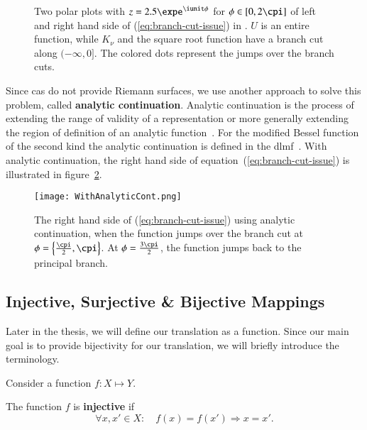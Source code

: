 \begin{figure}[!ht]
    \centering
    \hspace{1cm}
    \caption{Two polar plots with $z=2.5\expe^{\iunit\phi}$ for $\phi \in [0,2\cpi]$ of left and right hand side of (\ref{eq:branch-cut-issue}) in \Maple. $U$ is an entire function, while $K_\nu$ and the square root function have a branch cut along $(-\infty,0]$. The colored dots represent the jumps over the branch cuts.}
    \label{fig:u-bessel}
\end{figure}

Since \gls{cas} do not provide Riemann surfaces, we use another approach to solve this problem, called \textbf{analytic continuation}. Analytic continuation is the process of extending the range of validity of a representation or more generally extending the region of definition of an analytic function~\cite[152]{ComplexVariables}. For the modified Bessel function of the second kind the analytic continuation is defined in the \gls{dlmf}~\cite[(10.34.4)]{NIST:DLMF}. With analytic continuation, the right hand side of equation~(\ref{eq:branch-cut-issue}) is illustrated in figure~\ref{fig:analytic-cont}.

\begin{figure}[!ht]
    \centering
    \texttt{[image: WithAnalyticCont.png]}
    \caption{The right hand side of (\ref{eq:branch-cut-issue}) using analytic continuation, when the function jumps over the branch cut at $\phi = \left\{\frac{\cpi}{2},\cpi\right\}$. At $\phi = \frac{3\cpi}{2}$, the function jumps back to the principal branch.}
    \label{fig:analytic-cont}
\end{figure}

\subsection{Injective, Surjective \& Bijective Mappings}
Later in the thesis, we will define our translation as a function. Since our main goal is to provide bijectivity for our translation, we will briefly introduce the terminology.

Consider a function $f: X \mapsto Y$.

\begin{definition}
The function $f$ is \textbf{injective} if
\begin{equation}
\forall x,x' \in X: \quad f(x) = f(x') \Rightarrow x = x'.
\end{equation}
\end{definition}

